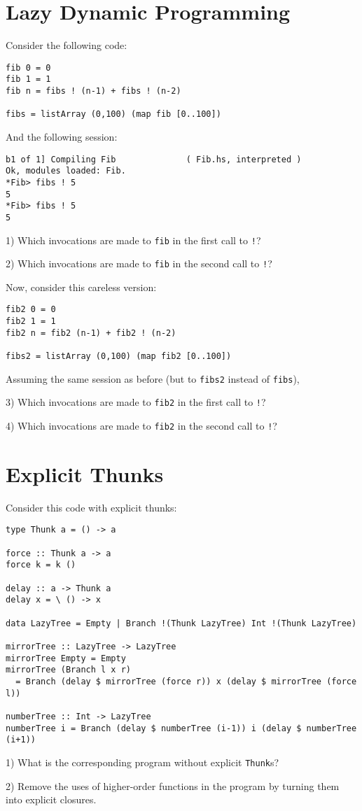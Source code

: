 \documentclass{article}
\begin{document}
\section{Lazy Dynamic Programming}

Consider the following code:

\begin{verbatim}
fib 0 = 0
fib 1 = 1
fib n = fibs ! (n-1) + fibs ! (n-2)

fibs = listArray (0,100) (map fib [0..100])
\end{verbatim}

And the following session:

\begin{verbatim}
b1 of 1] Compiling Fib              ( Fib.hs, interpreted )
Ok, modules loaded: Fib.
*Fib> fibs ! 5
5
*Fib> fibs ! 5
5
\end{verbatim}

1) Which invocations are made to \verb!fib! in the first
   call to \verb~!~?

2) Which invocations are made to \verb!fib! in the second
   call to \verb~!~?

Now, consider this careless version:

\begin{verbatim}
fib2 0 = 0
fib2 1 = 1
fib2 n = fib2 (n-1) + fib2 ! (n-2)

fibs2 = listArray (0,100) (map fib2 [0..100])
\end{verbatim}

Assuming the same session as before (but to \verb!fibs2! instead of \verb!fibs!),

3) Which invocations are made to \verb!fib2! in the first call to \verb~!~?

4) Which invocations are made to \verb!fib2! in the second call to \verb~!~?

\pagebreak

\section{Explicit Thunks}

Consider this code with explicit thunks:

\begin{verbatim}
type Thunk a = () -> a

force :: Thunk a -> a
force k = k ()

delay :: a -> Thunk a
delay x = \ () -> x

data LazyTree = Empty | Branch !(Thunk LazyTree) Int !(Thunk LazyTree)

mirrorTree :: LazyTree -> LazyTree
mirrorTree Empty = Empty
mirrorTree (Branch l x r)
  = Branch (delay $ mirrorTree (force r)) x (delay $ mirrorTree (force l))

numberTree :: Int -> LazyTree
numberTree i = Branch (delay $ numberTree (i-1)) i (delay $ numberTree (i+1))
\end{verbatim}

1) What is the corresponding program without explicit \verb!Thunk!s?

2) Remove the uses of higher-order functions in the program by turning
   them into explicit closures.
\end{document}
